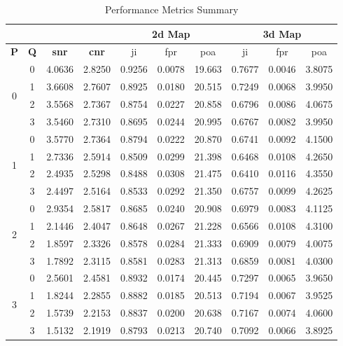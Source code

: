 \begin{table}[htbp!]
\centering
\caption{Performance Metrics Summary}
\begin{tabular}{cccccccccc}
\cline{5-10}
&&&& \multicolumn{3}{c}{\textbf{\gls{2d} Map}} & \multicolumn{3}{c}{\textbf{\gls{3d} Map}} \\ \hline
\textbf{P} & \textbf{Q} & \textbf{\gls{snr}} & \textbf{\gls{cnr}} & \gls{ji} & \gls{fpr} & \gls{poa} & \gls{ji} & \gls{fpr} & \gls{poa} \\ \hline
\multirow{4}{*}{0} & 0 & 4.0636 & 2.8250 & 0.9256 & 0.0078 & 19.663 & 0.7677 & 0.0046 & 3.8075 \\
 & 1 & 3.6608 & 2.7607 & 0.8925 & 0.0180 & 20.515 & 0.7249 & 0.0068 & 3.9950 \\
 & 2 & 3.5568 & 2.7367 & 0.8754 & 0.0227 & 20.858 & 0.6796 & 0.0086 & 4.0675 \\
 & 3 & 3.5460 & 2.7310 & 0.8695 & 0.0244 & 20.995 & 0.6767 & 0.0082 & 3.9950 \\ \hline
\multirow{4}{*}{1} & 0 & 3.5770 & 2.7364 & 0.8794 & 0.0222 & 20.870 & 0.6741 & 0.0092 & 4.1500 \\
 & 1 & 2.7336 & 2.5914 & 0.8509 & 0.0299 & 21.398 & 0.6468 & 0.0108 & 4.2650 \\
 & 2 & 2.4935 & 2.5298 & 0.8488 & 0.0308 & 21.475 & 0.6410 & 0.0116 & 4.3550 \\
 & 3 & 2.4497 & 2.5164 & 0.8533 & 0.0292 & 21.350 & 0.6757 & 0.0099 & 4.2625 \\ \hline
\multirow{4}{*}{2} & 0 & 2.9354 & 2.5817 & 0.8685 & 0.0240 & 20.908 & 0.6979 & 0.0083 & 4.1125 \\
 & 1 & 2.1446 & 2.4047 & 0.8648 & 0.0267 & 21.228 & 0.6566 & 0.0108 & 4.3100 \\
 & 2 & 1.8597 & 2.3326 & 0.8578 & 0.0284 & 21.333 & 0.6909 & 0.0079 & 4.0075 \\
 & 3 & 1.7892 & 2.3115 & 0.8581 & 0.0283 & 21.313 & 0.6859 & 0.0081 & 4.0300 \\ \hline
\multirow{4}{*}{3} & 0 & 2.5601 & 2.4581 & 0.8932 & 0.0174 & 20.445 & 0.7297 & 0.0065 & 3.9650 \\
 & 1 & 1.8244 & 2.2855 & 0.8882 & 0.0185 & 20.513 & 0.7194 & 0.0067 & 3.9525 \\
 & 2 & 1.5739 & 2.2153 & 0.8837 & 0.0200 & 20.638 & 0.7167 & 0.0074 & 4.0600 \\
 & 3 & 1.5132 & 2.1919 & 0.8793 & 0.0213 & 20.740 & 0.7092 & 0.0066 & 3.8925 \\ \hline
\end{tabular}
\label{tab:perfSum}
\end{table}